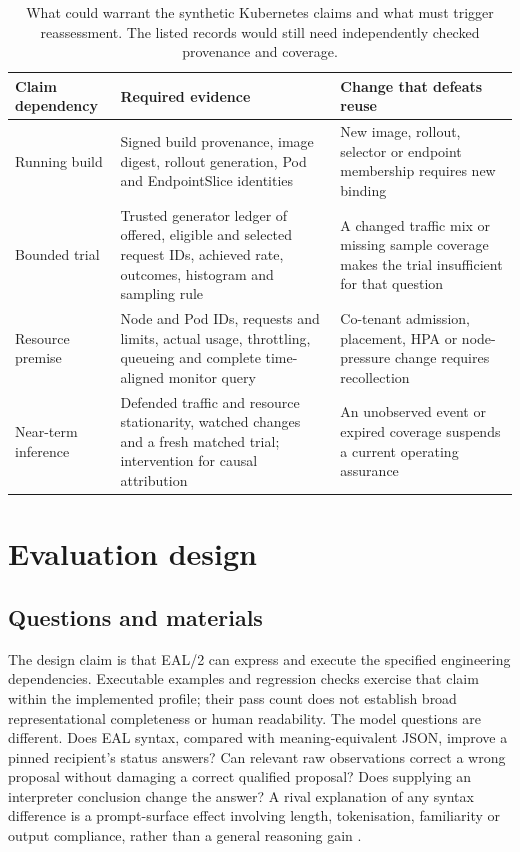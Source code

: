 \documentclass[preprint,12pt]{elsarticle}
\begin{document}
\begin{table}[H]
\centering\small
\setlength{\tabcolsep}{4pt}
\caption{What could warrant the synthetic Kubernetes claims and what must trigger reassessment. The listed records would still need independently checked provenance and coverage.}
\label{tab:kube-evidence}
\begin{tabular}{@{}>{\raggedright\arraybackslash}p{2.4cm}>{\raggedright\arraybackslash}p{4.1cm}>{\raggedright\arraybackslash}p{4.6cm}@{}}
\toprule
Claim dependency & Required evidence & Change that defeats reuse\\
\midrule
Running build & Signed build provenance, image digest, rollout generation, Pod and EndpointSlice identities & New image, rollout, selector or endpoint membership requires new binding\\
Bounded trial & Trusted generator ledger of offered, eligible and selected request IDs, achieved rate, outcomes, histogram and sampling rule & A changed traffic mix or missing sample coverage makes the trial insufficient for that question\\
Resource premise & Node and Pod IDs, requests and limits, actual usage, throttling, queueing and complete time-aligned monitor query & Co-tenant admission, placement, HPA or node-pressure change requires recollection\\
Near-term inference & Defended traffic and resource stationarity, watched changes and a fresh matched trial; intervention for causal attribution & An unobserved event or expired coverage suspends a current operating assurance\\
\bottomrule
\end{tabular}
\end{table}

\section{Evaluation design}\label{sec:methods}
\subsection{Questions and materials}
The design claim is that EAL/2 can express and execute the specified engineering dependencies. Executable examples and regression checks exercise that claim within the implemented profile; their pass count does not establish broad representational completeness or human readability. The model questions are different. Does EAL syntax, compared with meaning-equivalent JSON, improve a pinned recipient's status answers? Can relevant raw observations correct a wrong proposal without damaging a correct qualified proposal? Does supplying an interpreter conclusion change the answer? A rival explanation of any syntax difference is a prompt-surface effect involving length, tokenisation, familiarity or output compliance, rather than a general reasoning gain \citep{sclar2024}.
\end{document}
